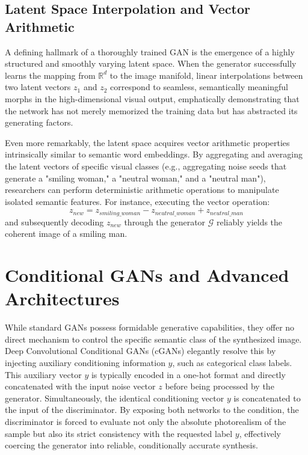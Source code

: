 \subsection{Latent Space Interpolation and Vector Arithmetic}
A defining hallmark of a thoroughly trained GAN is the emergence of a highly structured and smoothly varying latent space. When the generator successfully learns the mapping from $\mathbb{R}^d$ to the image manifold, linear interpolations between two latent vectors $z_1$ and $z_2$ correspond to seamless, semantically meaningful morphs in the high-dimensional visual output, emphatically demonstrating that the network has not merely memorized the training data but has abstracted its generating factors.

Even more remarkably, the latent space acquires vector arithmetic properties intrinsically similar to semantic word embeddings. By aggregating and averaging the latent vectors of specific visual classes (e.g., aggregating noise seeds that generate a "smiling woman," a "neutral woman," and a "neutral man"), researchers can perform deterministic arithmetic operations to manipulate isolated semantic features. For instance, executing the vector operation:
\begin{equation}
z_{new} = z_{smiling\_woman} - z_{neutral\_woman} + z_{neutral\_man}
\end{equation}
and subsequently decoding $z_{new}$ through the generator $\mathcal{G}$ reliably yields the coherent image of a smiling man.

\section{Conditional GANs and Advanced Architectures}
While standard GANs possess formidable generative capabilities, they offer no direct mechanism to control the specific semantic class of the synthesized image. Deep Convolutional Conditional GANs (cGANs) elegantly resolve this by injecting auxiliary conditioning information $y$, such as categorical class labels. This auxiliary vector $y$ is typically encoded in a one-hot format and directly concatenated with the input noise vector $z$ before being processed by the generator. Simultaneously, the identical conditioning vector $y$ is concatenated to the input of the discriminator. By exposing both networks to the condition, the discriminator is forced to evaluate not only the absolute photorealism of the sample but also its strict consistency with the requested label $y$, effectively coercing the generator into reliable, conditionally accurate synthesis.

